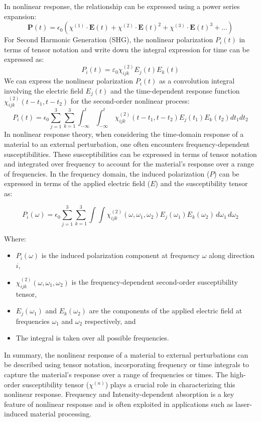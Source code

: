In nonlinear response, the relationship can be expressed using a power series expansion:
\[
	\mathbf{P}(t) =\epsilon_0( \chi^{(1)} \cdot \mathbf{E}(t)+\chi^{(2)} \cdot \mathbf{E}(t)^2 + \chi^{(3)}
	\cdot \mathbf{E}(t)^3 + ...)
\]
For Second Harmonic Generation (SHG), the nonlinear polarization $P_i (t)$ in terms of tensor notation and write down the integral expression for time can be expressed as:
\[
	P_i(t) = \varepsilon_0 \chi^{(2)}_{ijk} E_j(t)E_k(t)
\]
We can express the nonlinear polarization $P_i(t)$ as a convolution integral involving the electric field $E_j(t)$ and the time-dependent response function $\chi^{(2)}_{ijk}(t-t_1,t-t_2)$ for the second-order nonlinear process:
\[
	P_i(t) = \epsilon_0 \sum_{j=1}^{3} \sum_{k=1}^{3}\int_{-\infty}^t \int_{-\infty}^t \, \chi^{(2)}_{ijk}(t-t_1,t-t_2) E_j(t_1)E_k(t_2) dt_1 dt_2
\]
In nonlinear response theory, when considering the time-domain response of a material to an external perturbation, one often encounters frequency-dependent susceptibilities. These susceptibilities can be expressed in terms of tensor notation and integrated over frequency to account for the material's response over a range of frequencies. In the frequency domain, the induced polarization ($P$) can be expressed in terms of the applied electric field ($E$) and the susceptibility tensor as:

\[
	P_i(\omega) = \epsilon_0 \sum_{j=1}^{3} \sum_{k=1}^{3}\int\int \chi^{(2)}_{ijk}(\omega, \omega_1, \omega_2) E_j(\omega_1) E_k(\omega_2) \, d\omega_1 \, d\omega_2
\]

Where:
\begin{itemize}
	\item $P_i(\omega)$ is the induced polarization component at frequency $\omega$ along direction
	      $i$,
	\item $\chi^{(2)}_{ijk}(\omega, \omega_1, \omega_2)$ is the frequency-dependent second-order susceptibility tensor,
	\item $E_j(\omega_1)$ and $E_k(\omega_2)$ are the components of the applied electric field at frequencies $\omega_1$ and $\omega_2$ respectively, and
	\item The integral is taken over all possible frequencies.
\end{itemize}

In summary, the nonlinear response of a material to external perturbations can be described using
tensor notation, incorporating frequency or time integrals to capture the material's response over
a range of frequencies or times. The high-order susceptibility tensor ($\chi^{(n)}$) plays a crucial role in characterizing this nonlinear response.
Frequency and Intensity-dependent absorption is a key feature of nonlinear response and is often exploited in applications such as laser-induced material processing.

